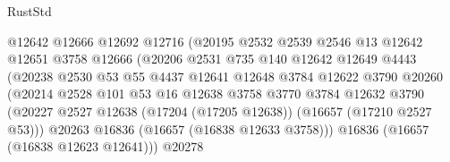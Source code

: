 \begin{lexlean}{RustStd}
\begin{coremodule}
                                    @12642
                                    @12666
                                    @12692
                                    @12716
                                    (@20195
                                      @2532
                                      @2539
                                      @2546
                                      @13
                                      @12642
                                      @12651
                                      @3758
                                      @12666
                                      (@20206
                                        @2531
                                        @735
                                        @140
                                        @12642
                                        @12649
                                        @4443
                                        (@20238
                                          @2530
                                          @53
                                          @55
                                          @4437
                                          @12641
                                          @12648
                                          @3784
                                          @12622
                                          @3790
                                          @20260
                                          (@20214
                                            @2528
                                            @101
                                            @53
                                            @16
                                            @12638
                                            @3758
                                            @3770
                                            @3784
                                            @12632
                                            @3790
                                            (@20227
                                              @2527
                                              @12638
                                              (@17204 (@17205 @12638))
                                              (@16657 (@17210 @2527 @53)))
                                            @20263
                                            @16836
                                            (@16657 (@16838 @12633 @3758)))
                                          @16836
                                          (@16657 (@16838 @12623 @12641)))
                                        @20278

\end{coremodule}
\end{lexlean}
